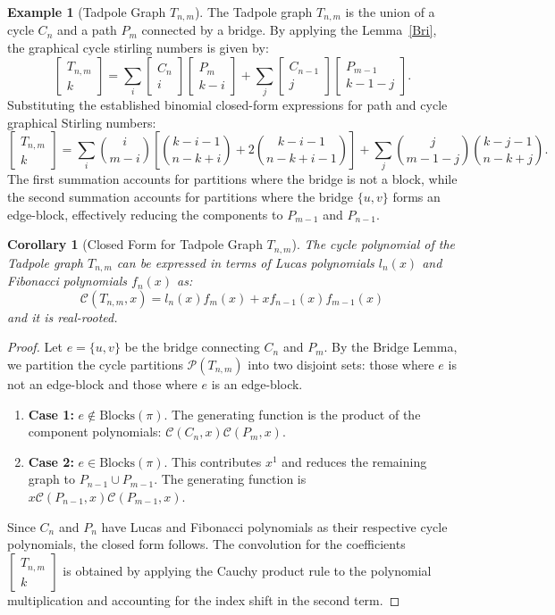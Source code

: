 \documentclass{amsart}
\newtheorem{corollary}[theorem]{Corollary}
\theoremstyle{definition}
\newtheorem{example}[theorem]{Example}
\def\st#1#2{\begin{bmatrix} #1 \\ #2 \end{bmatrix}}
\begin{document}
\begin{example}[Tadpole Graph $T_{n,m}$]
The Tadpole graph $T_{n,m}$ is the union of a cycle $C_n$ and a path $P_m$ connected by a bridge. 
By applying the Lemma~\ref{Bri},
the graphical cycle stirling numbers is given by:
\begin{equation*}
    \st{T_{n,m}}{k} = \sum_i \st{C_n}{i} \st{P_m}{k-i} + \sum_j \st{C_{n-1}}{j} \st{P_{m-1}}{k-1-j}.
\end{equation*}
Substituting the established binomial closed-form expressions for path and cycle graphical Stirling numbers:
\begin{equation*}
    \st{T_{n,m}}{k} = \sum_{i} \binom{i}{m-i} \left[ \binom{k-i-1}{n-k+i} + 2\binom{k-i-1}{n-k+i-1} \right] + \sum_{j} \binom{j}{m-1-j} \binom{k-j-1}{n-k+j}.
\end{equation*}
The first summation accounts for partitions where the bridge is not a block, while the second summation accounts for partitions where the bridge $\{u, v\}$ forms an edge-block, effectively reducing the components to $P_{m-1}$ and $P_{n-1}$.
\end{example}

\begin{corollary}[Closed Form for Tadpole Graph $T_{n,m}$]
The cycle polynomial of the Tadpole graph $T_{n,m}$ can be expressed in terms of Lucas polynomials $l_n(x)$ and Fibonacci polynomials $f_n(x)$ as:
\begin{equation*}
    \mathcal{C}(T_{n,m}, x) = l_n(x) f_m(x) + x f_{n-1}(x) f_{m-1}(x)
\end{equation*}
and it is real-rooted.
\end{corollary}
\begin{proof}
Let $e = \{u, v\}$ be the bridge connecting $C_n$ and $P_m$. By the Bridge Lemma, we partition the cycle partitions $\mathcal{P}(T_{n,m})$ into two disjoint sets: those where $e$ is not an edge-block and those where $e$ is an edge-block.
\begin{enumerate}
    \item \textbf{Case 1:} $e \notin \text{Blocks}(\pi)$. The generating function is the product of the component polynomials: $\mathcal{C}(C_n, x)\mathcal{C}(P_m, x)$.
    \item \textbf{Case 2:} $e \in \text{Blocks}(\pi)$. This contributes $x^1$ and reduces the remaining graph to $P_{n-1} \cup P_{m-1}$. The generating function is $x \mathcal{C}(P_{n-1}, x)\mathcal{C}(P_{m-1}, x)$.
\end{enumerate}
Since $C_n$ and $P_n$ have Lucas and Fibonacci polynomials as their respective cycle polynomials, the closed form follows. The convolution for the coefficients $\st{T_{n,m}}{k}$ is obtained by applying the Cauchy product rule to the polynomial multiplication and accounting for the index shift in the second term.
\end{proof}
\end{document}
